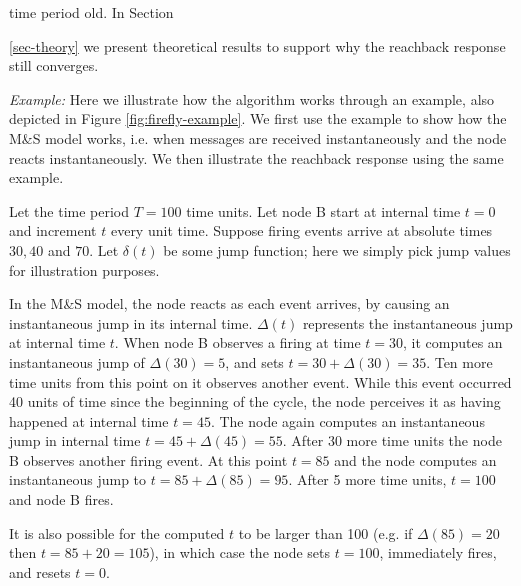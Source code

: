 \documentclass{sig-alternate}
\begin{document}
time period old. In Section {\ref{sec-theory} we present theoretical
results to support why the reachback response still converges. 



{\em Example:} Here we illustrate how the algorithm works through an
example, also depicted in Figure \ref{fig:firefly-example}. We first
use the example to show how the M\&S model works, i.e. when messages
are received instantaneously and the node reacts instantaneously. We
then illustrate the reachback response using the same example.

Let the time period $T = 100$ time units. Let node B start at internal
time $t=0$ and increment $t$ every unit time.  Suppose firing events
arrive at absolute times $30, 40$ and $70$. Let $\delta(t)$ be some
jump function; here we simply pick jump values for illustration
purposes.

In the M\&S model, the node reacts as each event arrives, by causing
an instantaneous jump in its internal time. $\Delta(t)$ represents the
instantaneous jump at internal time $t$. When node B observes a
firing at time $t=30$, it computes an instantaneous jump of
$\Delta(30)=5$, and sets $t = 30+\Delta(30) = 35$. Ten more time units
from this point on it observes another event. While this event
occurred 40 units of time since the beginning of the cycle, the node
perceives it as having happened at internal time $t = 45$. The node
again computes an instantaneous jump in internal time $t=45+\Delta(45)
= 55$. After 30 more time units the node B observes another firing
event. At this point $t=85$ and the node computes an instantaneous
jump to $t=85+\Delta(85)=95$. After 5 more time units, $t=100$ and
node B fires. 

It is also possible for the computed $t$ to be larger than 100
(e.g. if $\Delta(85)=20$ then $t=85+20=105$), in which case the node
sets $t=100$, immediately fires, and resets $t=0$.

}
\end{document}
